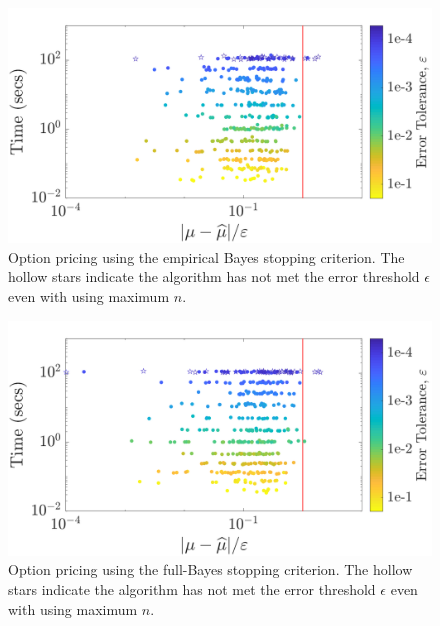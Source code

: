 \documentclass[graybox,footinfo]{svmult}
\begin{document}
\begin{figure}
\centering
\includegraphics[width=0.95\linewidth]{"figures/Sobol/Sobol_optPrice_guaranteed_time_MLE__d12_r1_2019-Sep-1"}
\caption[Sobol: Option pricing guaranteed: MLE]{Option pricing using the empirical Bayes stopping criterion. The hollow stars indicate the algorithm has not met the error threshold $\epsilon$ even with using maximum $n$.}
\label{FJ:fig:Sobol-optprice-guaranteed-MLE}
\end{figure}
\begin{figure}
\centering
\includegraphics[width=0.95\linewidth]{"figures/Sobol/Sobol_optPrice_guaranteed_time_full__d12_r1_2019-Sep-1"}
\caption[Sobol: Option pricing guaranteed: Full Bayes]{Option pricing using the full-Bayes stopping criterion. The hollow stars indicate the algorithm has not met the error threshold $\epsilon$ even with using maximum $n$.}
\label{FJ:fig:Sobol-optprice-guaranteed-FB}
\end{figure}
\end{document}
